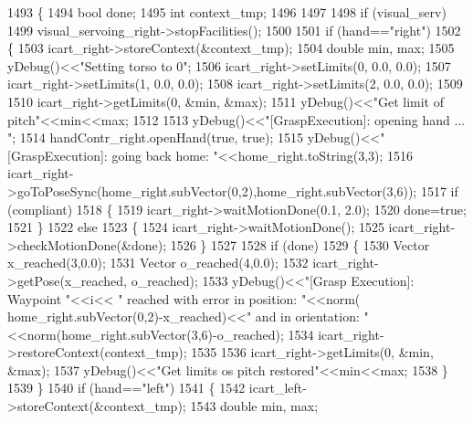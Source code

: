 \begin{DoxyCode}
1493 \{
1494     \textcolor{keywordtype}{bool} done;
1495     \textcolor{keywordtype}{int} context\_tmp;
1496 
1497 
1498     \textcolor{keywordflow}{if} (visual\_serv)
1499         visual_servoing_right->stopFacilities();
1500 
1501     \textcolor{keywordflow}{if} (hand==\textcolor{stringliteral}{"right"})
1502     \{
1503         icart\_right->storeContext(&context\_tmp);
1504         \textcolor{keywordtype}{double} min, max;
1505         yDebug()<<\textcolor{stringliteral}{"Setting torso to 0"};
1506         icart\_right->setLimits(0, 0.0, 0.0);
1507         icart\_right->setLimits(1, 0.0, 0.0);
1508         icart\_right->setLimits(2, 0.0, 0.0);
1509 
1510         icart\_right->getLimits(0, &min, &max);
1511         yDebug()<<\textcolor{stringliteral}{"Get limit of pitch"}<<min<<max;
1512 
1513         yDebug()<<\textcolor{stringliteral}{"[GraspExecution]: opening hand ... "};
1514         handContr_right.openHand(\textcolor{keyword}{true}, \textcolor{keyword}{true});
1515         yDebug()<<\textcolor{stringliteral}{"[GraspExecution]: going back home: "}<<home\_right.toString(3,3);
1516         icart\_right->goToPoseSync(home\_right.subVector(0,2),home\_right.subVector(3,6));
1517         \textcolor{keywordflow}{if} (compliant)
1518         \{
1519             icart\_right->waitMotionDone(0.1, 2.0);
1520             done=\textcolor{keyword}{true};
1521         \}
1522         \textcolor{keywordflow}{else}
1523         \{
1524             icart\_right->waitMotionDone();
1525             icart\_right->checkMotionDone(&done);
1526         \}
1527 
1528         \textcolor{keywordflow}{if} (done)
1529         \{
1530              Vector x\_reached(3,0.0);
1531              Vector o\_reached(4,0.0);
1532              icart\_right->getPose(x\_reached, o\_reached);
1533              yDebug()<<\textcolor{stringliteral}{"[Grasp Execution]: Waypoint "}<<i<< \textcolor{stringliteral}{" reached with error in position: "}<<norm(
      home\_right.subVector(0,2)-x\_reached)<<\textcolor{stringliteral}{" and in orientation: "}<<norm(home\_right.subVector(3,6)-o\_reached);
1534              icart\_right->restoreContext(context\_tmp);
1535 
1536              icart\_right->getLimits(0, &min, &max);
1537              yDebug()<<\textcolor{stringliteral}{"Get limits os pitch restored"}<<min<<max;
1538         \}
1539     \}
1540     \textcolor{keywordflow}{if} (hand==\textcolor{stringliteral}{"left"})
1541     \{
1542         icart\_left->storeContext(&context\_tmp);
1543         \textcolor{keywordtype}{double} min, max;

\end{DoxyCode}
